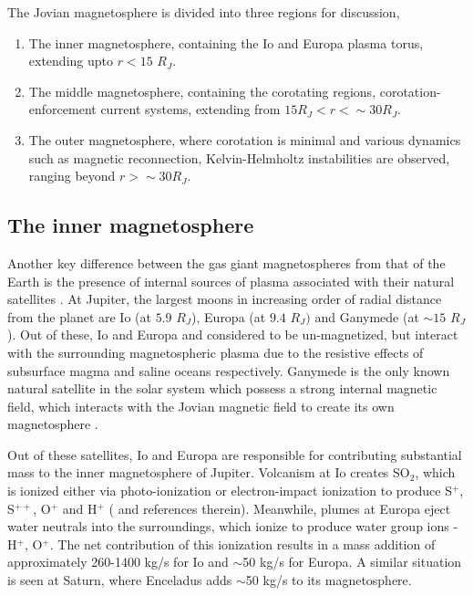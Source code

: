 The Jovian magnetosphere is divided into three regions for discussion, 

\begin{enumerate}
    \item The inner magnetosphere, containing the Io and Europa plasma torus, extending upto $r < 15$ $R_J$.
    \item The middle magnetosphere, containing the corotating regions, corotation-enforcement current systems, extending from $15 R_J < r < \sim30 R_J$.
    \item The outer magnetosphere, where corotation is minimal and various dynamics such as magnetic reconnection, Kelvin-Helmholtz instabilities are observed, ranging beyond $r > \sim30 R_J$. 
\end{enumerate}

\subsection{The inner magnetosphere}
Another key difference between the gas giant magnetospheres from that of the Earth is the presence of internal sources of plasma associated with their natural satellites \cite{Bolton2015a}. At Jupiter, the largest moons in increasing order of radial distance from the planet are Io (at $5.9$ $R_J$), Europa (at $9.4$ $R_J)$ and Ganymede (at $\sim15$ $R_J$). Out of these, Io and Europa and considered to be un-magnetized, but interact with the surrounding magnetospheric plasma due to the resistive effects of subsurface magma and saline oceans respectively. Ganymede is the only known natural satellite in the solar system which possess a strong internal magnetic field, which interacts with the Jovian magnetic field to create its own magnetosphere \cite{Russell2005InteractionEnvironments,Jia2010MagneticSaturn,Khurana2011EvidenceInterior}. 

Out of these satellites, Io and Europa are responsible for contributing substantial mass to the inner magnetosphere of Jupiter. Volcanism at Io creates SO$_2$, which is ionized either via photo-ionization or electron-impact ionization to produce S$^{+}$, S$^{++}$, O$^+$ and H$^+$ ( and references therein). Meanwhile, plumes at Europa eject water neutrals into the surroundings, which ionize to produce water group ions - H$^+$, O$^+$. The net contribution of this ionization results in a mass addition of approximately 260-1400 kg/s for Io \cite{Bagenal2011b} and $\sim$50 kg/s for Europa. A similar situation is seen at Saturn, where Enceladus adds $\sim$50 kg/s to its magnetosphere. 

